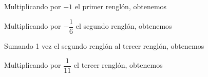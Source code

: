 \begin{examplebox}{}{}
\begin{matrizn}
    \end{matrizn}
    Multiplicando por $-1$ el primer renglón, obtenemos
    \begin{matrizn}
    \end{matrizn}
    Multiplicando por $-\dfrac{1}{6}$ el segundo renglón, obtenemos
    \begin{matrizn}
    \end{matrizn}
    Sumando 1 vez el segundo renglón al tercer renglón, obtenemos
    \begin{matrizn}
    \end{matrizn}
    Multiplicando por $\dfrac{1}{11}$ el tercer renglón, obtenemos

\end{examplebox}
